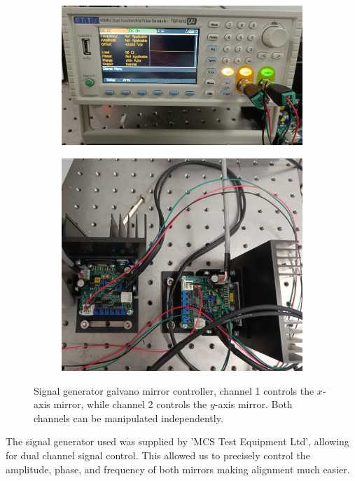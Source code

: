 \begin{figure}[h!]
	\centering
	\begin{subfigure}{0.475\linewidth}
		\includegraphics[width=\linewidth]{signal_generator.jpg}
		\caption{}
	\end{subfigure}
	\begin{subfigure}{0.475\linewidth}
		\includegraphics[width=\linewidth, height=0.7\linewidth]
		{galvano_mirror_controllers.jpg}
		\caption{}
	\end{subfigure}
	
	\caption{Signal generator galvano mirror controller, channel 1 controls the $x$-axis 
		mirror, while channel 2 controls the $y$-axis mirror. Both channels can be manipulated
		independently.}
	\label{fig:signal_generator}
\end{figure}

The signal generator used was supplied by 'MCS Test Equipment Ltd', 
allowing for dual channel signal control. This allowed us to precisely control the amplitude, phase, and frequency of both mirrors making 
alignment much easier. 

